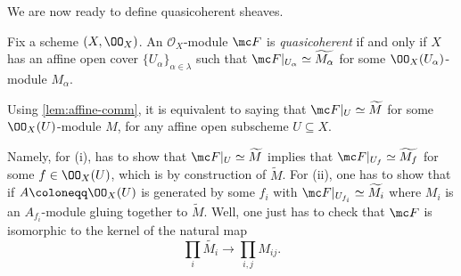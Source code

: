 \documentclass[../notes.tex]{subfiles}
\begin{document}
We are now ready to define quasicoherent sheaves.
\begin{definition}
	Fix a scheme $(X,\OO_X)$. An $\mathcal O_X$-module $\mc F$ is \textit{quasicoherent} if and only if $X$ has an affine open cover $\{U_\alpha\}_{\alpha\in\lambda}$ such that $\mc F|_{U_\alpha}\simeq\widetilde{M_\alpha}$ for some $\OO_X(U_\alpha)$-module $M_\alpha$.
\end{definition}
Using \autoref{lem:affine-comm}, it is equivalent to saying that $\mc F|_U\simeq\widetilde M$ for some $\OO_X(U)$-module $M$, for any affine open subscheme $U\subseteq X$.

Namely, for (i), has to show that $\mc F|_U\simeq\widetilde M$ implies that $\mc F|_{U_f}\simeq\widetilde{M_f}$ for some $f\in\OO_X(U)$, which is by construction of $\widetilde M$. For (ii), one has to show that if $A\coloneqq\OO_X(U)$ is generated by some $f_i$ with $\mc F|_{U_{f_i}}\simeq\widetilde{M_i}$ where $M_i$ is an $A_{f_i}$-module gluing together to $\widetilde M$. Well, one just has to check that $\mc F$ is isomorphic to the kernel of the natural map
\[\prod_i\widetilde{M_i}\to\prod_{i,j}M_{ij}.\]
\end{document}
